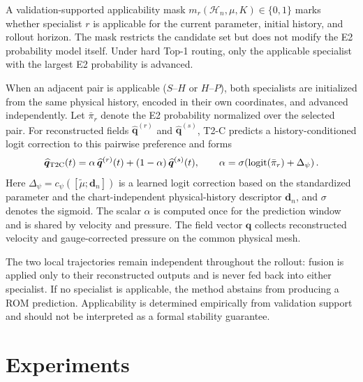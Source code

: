\documentclass{article}
\begin{document}
A validation-supported applicability mask $m_r(\mathcal H_n,\mu,K)\in\{0,1\}$ marks whether specialist $r$ is applicable for the current parameter, initial history, and rollout horizon. The mask restricts the candidate set but does not modify the E2 probability
model itself. Under hard Top-1 routing, only the applicable specialist with the largest E2 probability is advanced.

When an adjacent pair is applicable ($S$--$H$ or $H$--$P$), both specialists are initialized from the same physical history, encoded in
their own coordinates, and advanced independently. Let $\bar\pi_r$ denote the E2 probability normalized over the selected pair. For reconstructed fields $\widehat{\bm q}^{(r)}$ and $\widehat{\bm q}^{(s)}$, T2-C predicts a history-conditioned logit correction to this pairwise preference and forms
\begin{equation}
  \widehat{\bm q}_{\rm T2C}(t)
  =\alpha\,\widehat{\bm q}^{(r)}(t)
  +(1-\alpha)\,\widehat{\bm q}^{(s)}(t),
  \qquad
  \alpha=
  \sigma\!\left(
  \operatorname{logit}(\bar\pi_r)+\Delta_\psi
  \right).
  \label{eq:main_t2c}
\end{equation}
Here $\Delta_\psi=c_\psi([\widetilde\mu;\bm d_n])$ is a learned logit correction based on the standardized parameter and the chart-independent physical-history descriptor $\bm d_n$, and $\sigma$ denotes the sigmoid. The scalar $\alpha$ is computed once for the prediction window and is shared by velocity and pressure. The field vector $\bm q$ collects reconstructed velocity and gauge-corrected pressure on the common physical mesh.

The two local trajectories remain independent throughout the rollout: fusion is applied only to their reconstructed outputs and is never fed back into either specialist. If no specialist is applicable, the method abstains from producing a ROM prediction. Applicability is determined empirically from validation support and should not be interpreted as a formal stability guarantee.

\section{Experiments}
\label{sec:experiments}
\end{document}
